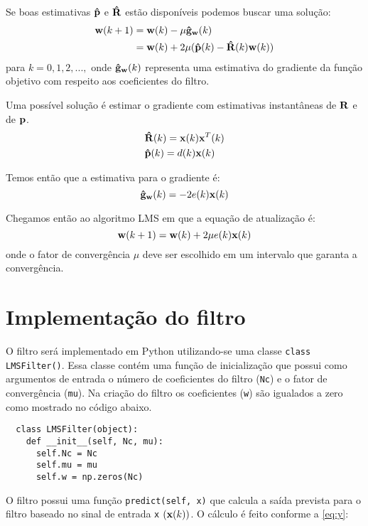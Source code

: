 Se boas estimativas ${\bf \hat{p}}$ e ${\bf \hat{R}}$ estão disponíveis podemos buscar uma solução:
\begin{align}
{\bf w}(k+1) & = {\bf w}(k) - \mu {\bf \hat{g}_w}(k) \\
& = {\bf w}(k) + 2 \mu ({\bf \hat{p}}(k) - {\bf \hat{R}}(k){\bf w}(k))
\end{align}
para $k = 0, 1, 2,...,$ onde ${\bf \hat{g}_w}(k)$ representa uma estimativa do gradiente da função objetivo com respeito aos coeficientes do filtro.

Uma possível solução é estimar o gradiente com estimativas instantâneas de ${\bf R}$ e de ${\bf p}$.
\begin{align}
& {\bf \hat{R}}(k) = {\bf x}(k) {\bf x}^T(k) \\
& {\bf \hat{p}}(k) = d(k)       {\bf x}(k)
\end{align}

Temos então que a estimativa para o gradiente é:
\begin{equation}
{\bf \hat{g}_w}(k) = -2e(k){\bf x}(k)
\end{equation}

Chegamos então ao algoritmo LMS em que a equação de atualização é:
\begin{equation}\label{eq:LMS}
{\bf w}(k+1) = {\bf w}(k) + 2 \mu e(k) {\bf x}(k)
\end{equation}
onde o fator de convergência $\mu$ deve ser escolhido em um intervalo que garanta a convergência.

\section{Implementação do filtro}

O filtro será implementado em Python utilizando-se uma classe \texttt{class LMSFilter()}. Essa classe contém uma função de inicialização que possui como argumentos de entrada o número de coeficientes do filtro (\texttt{Nc}) e o fator de convergência (\texttt{mu}). Na criação do filtro os coeficientes (\texttt{w}) são igualados a zero como mostrado no código abaixo.

\begin{verbatim}
  class LMSFilter(object):
    def __init__(self, Nc, mu):
      self.Nc = Nc
      self.mu = mu
      self.w = np.zeros(Nc)
\end{verbatim}

O filtro possui uma função \texttt{predict(self, x)} que calcula a saída prevista para o filtro baseado no sinal de entrada \texttt{x} $({\bf x}(k))$. O cálculo é feito conforme a \cref{eq:y}:

